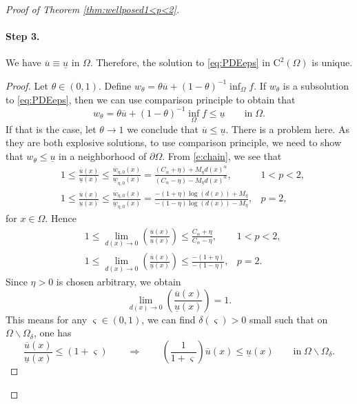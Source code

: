 \documentclass[11pt,reqno]{amsart}
\numberwithin{figure}{section}
\theoremstyle{plain}
\theoremstyle{remark}
\numberwithin{equation}{section}
\begin{document}
\begin{appendices}
\begin{proof} [Proof of Theorem \ref{thm:wellposed1<p<2}]
\paragraph{\textbf{Step 3.}} We have $\overline{u}\equiv \underline{u}$ in $\Omega$. Therefore, the solution to \eqref{eq:PDEeps} in $\mathrm{C}^2(\Omega)$ is unique.

\begin{proof} Let $\theta\in (0,1)$. Define $w_\theta = \theta \overline{u} + (1-\theta) ^{-1}\inf_{\Omega} f$. If $w_\theta$ is a subsolution to \eqref{eq:PDEeps}, then we can use comparison principle to obtain that
\begin{equation*}
    w_\theta = \theta \overline{u} + (1-\theta) ^{-1}\inf_{\Omega} f\leq \underline{u} \qquad\text{in}\;\Omega.
\end{equation*}
If that is the case, let $\theta\to 1$ we conclude that $\overline{u} \leq \underline{u}$. There is a problem here. As they are both explosive solutions, to use comparison principle, we need to show that $w_\theta \leq \underline{u}$ in a neighborhood of $\partial\Omega$. From \eqref{e:chain}, we see that
\begin{align*}
    &1\leq \frac{\overline{u}(x)}{\underline{u}(x)} \leq \frac{\overline{w}_{\eta,0}(x)}{\underline{w}_{\eta,0}(x)} = \frac{(C_\alpha+\eta)+ M_\eta d(x)^\alpha}{(C_\alpha-\eta)- M_\eta d(x)^\alpha},& 1<p<2,\\
    &1 \leq \frac{\overline{u}(x)}{\underline{u}(x)} \leq \frac{\overline{w}_{\eta,0}(x)}{\underline{w}_{\eta,0}(x)} = \frac{-(1+\eta)\log(d(x)) + M_\eta}{-(1-\eta)\log(d(x))-M_\eta}, & p=2,
\end{align*}
for $x\in \Omega$. Hence
\begin{align*}
     &1\leq  \lim_{d(x)\to 0} \left(\frac{\overline{u}(x)}{\underline{u}(x)}\right) \leq \frac{C_\alpha+\eta}{C_\alpha-\eta}, & 1< p < 2,\\
     &1\leq  \lim_{d(x)\to 0} \left(\frac{\overline{u}(x)}{\underline{u}(x)}\right) \leq \frac{-(1+\eta)}{-(1-\eta)}, & p = 2.
\end{align*}
Since $\eta>0$ is chosen arbitrary, we obtain
\begin{equation*}
     \lim_{d(x)\to 0} \left(\frac{\overline{u}(x)}{\underline{u}(x)}\right) = 1.
\end{equation*}
 This means for any $\varsigma\in(0,1)$, we can find $\delta(\varsigma)>0$ small such that on $\Omega\backslash \Omega_\delta$, one has
\begin{equation*}
\frac{\overline{u}(x)}{\underline{u}(x)}\leq (1+\varsigma)     \qquad\Longrightarrow\qquad \left(\frac{1}{1+\varsigma}\right)\overline{u}(x) \leq \underline{u}(x) \qquad\text{in}\; \Omega\backslash \Omega_\delta.

\end{equation*}
\end{proof}
\end{proof}
\end{appendices}
\end{document}
